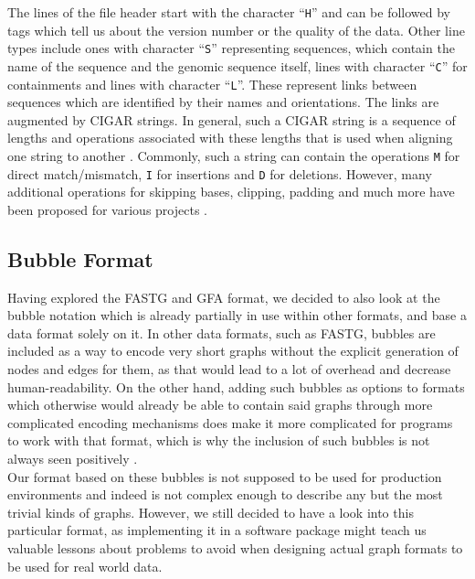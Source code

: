 \documentclass[a4paper,12pt,twoside,BCOR=10mm]{scrbook}
\begin{document}
The lines of the file header start with the character “\texttt{H}” and can be followed by tags which tell us about the 
version number or the quality of the data. 
Other line types include ones with character “\texttt{S}” representing sequences, which 
contain the name of the sequence and the genomic sequence itself, 
lines with character “\texttt{C}” for containments 
and lines with character “\texttt{L}”. 
These represent links between sequences which are identified by their names and orientations. 
The links are augmented by CIGAR strings. 
In general, such a CIGAR string is a sequence of lengths and operations 
associated with these lengths that is used when aligning one string to another \citep{specSAM}. 
Commonly, such a string can contain the operations \texttt{M} for direct match/mismatch, 
\texttt{I} for insertions and \texttt{D} for deletions. 
However, many additional operations for skipping bases, 
clipping, padding and much more have been proposed 
for various projects \citep{specGFA1,SAM2009}.

\subsection{Bubble Format}

Having explored the FASTG and GFA format, we decided to also look 
at the bubble notation which is already partially in use within other formats, 
and base a data format solely on it. 
In other data formats, such as FASTG, bubbles are included as a way to encode very short graphs 
without the explicit generation of nodes and edges for them, 
as that would lead to a lot of overhead and decrease human-readability. 
On the other hand, adding such bubbles as options to formats which otherwise 
would already be able to contain said graphs through more complicated encoding mechanisms 
does make it more complicated for programs to work with that format, which is why the inclusion 
of such bubbles is not always seen positively \citep{specGFA1}. \\
Our format based on these bubbles 
is not supposed to be used for production environments and indeed 
is not complex enough to describe any but the most trivial kinds of graphs. 
However, we still decided to have a look into this particular format, 
as implementing it in a software package might teach us valuable lessons 
about problems to avoid when designing actual graph formats to be used for real world data.
\end{document}
